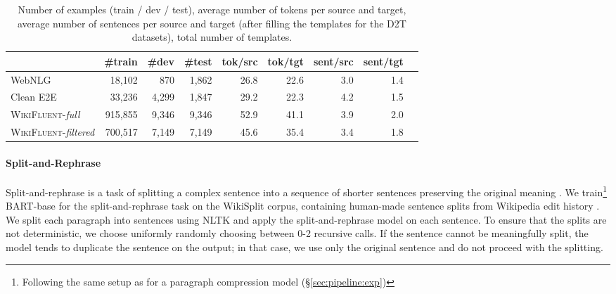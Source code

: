 \begin{table}[t]
    \centering
    \footnotesize
    \begin{tabular}{l rrrrrrrr}\toprule
                                              & \bf  \#train & \bf \#dev & \bf \#test & \bf tok/src & \bf tok/tgt & \bf sent/src & \bf sent/tgt \\  \midrule
        WebNLG                                & 18,102       & 870       & 1,862      & 26.8        & 22.6        & 3.0          & 1.4          \\
        Clean E2E                             & 33,236       & 4,299     & 1,847      & 29.2        & 22.3        & 4.2          & 1.5          \\ \midrule
        \textsc{WikiFluent}-\textit{full}     & 915,855      & 9,346     & 9,346      & 52.9        & 41.1        & 3.9          & 2.0          \\
        \textsc{WikiFluent}-\textit{filtered} & 700,517      & 7,149     & 7,149      & 45.6        & 35.4        & 3.4          & 1.8          \\ \bottomrule
    \end{tabular}
    \caption{Number of examples (train / dev / test), average number of tokens per source and target, average number of sentences per source and target (after filling the templates for the D2T datasets), total number of templates.}
    \label{tab:stats}
\end{table}

\paragraph{Split-and-Rephrase} Split-and-rephrase is a task of splitting a complex sentence into a sequence of shorter sentences preserving the original meaning \citep{narayan-etal-2017-split}. We train\footnote{Following the same setup as for a paragraph compression model (§\ref{sec:pipeline:exp})} BART-base \cite{lewisBARTDenoisingSequencetoSequence2019} for the split-and-rephrase task on the WikiSplit corpus, containing human-made sentence splits from Wikipedia edit history \cite{botha-etal-2018-learning}.  We split each paragraph into sentences using NLTK \cite{bird2006nltk} and apply the split-and-rephrase model on each sentence. To ensure that the splits are not deterministic, we choose uniformly randomly choosing between 0-2 recursive calls. If the sentence cannot be meaningfully split, the model tends to duplicate the sentence on the output; in that case, we use only the original sentence and do not proceed with the splitting.


